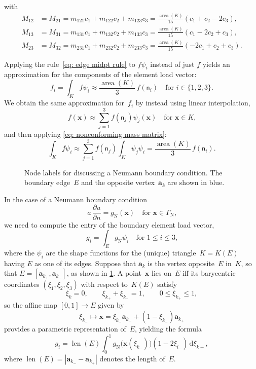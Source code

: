 \documentclass[a4paper,12pt]{article}
\newcommand{\bs}[1]{\boldsymbol{#1}}
\newcommand{\area}{\operatorname{area}}
\newcommand{\len}{\operatorname{len}}
\newcommand{\ud}{\mathrm{d}}
\newcommand{\uN}{\mathrm{N}}
\newcommand{\gN}{g_{\uN}}
\newcommand{\GammaN}{\Gamma_{\uN}}
\begin{document}
with
\begin{align*}
M_{12}&=M_{21}=m_{121}c_1+m_{122}c_2+m_{123}c_3=\frac{\area(K)}{15}
(c_1+c_2-2c_3),\\
M_{13}&=M_{31}=m_{131}c_1+m_{132}c_2+m_{133}c_3=\frac{\area(K)}{15}
(c_1-2c_2+c_3),\\
M_{23}&=M_{32}=m_{231}c_1+m_{232}c_2+m_{233}c_3=\frac{\area(K)}{15}
(-2c_1+c_2+c_3).
\end{align*}

Applying the rule~\eqref{eq: edge midpt rule} to $f\psi_i$ instead of just $f$
yields an approximation for the components of the element load vector:
\[
f_i=\int_Kf\psi_i\approx\frac{\area(K)}{3}\,f(\mathsf{n}_i)
\quad\text{for $i\in\{1,2,3\}$.}
\]
We obtain the same approximation for~$f_i$ by instead using linear
interpolation,
\[
f(\bs{x})\approx\sum_{j=1}^3f(\mathsf{n}_j)\psi_j(\bs{x})
    \quad\text{for $\bs{x}\in K$,}
\]
and then applying \eqref{eq: nonconforming mass matrix}:
\[
\int_Kf\psi_i\approx\sum_{j=1}^3f(\mathsf{n}_j)\int_K\psi_j\psi_i
    =\frac{\area(K)}{3}\,f(\mathsf{n}_i).
\]

\begin{figure}
\caption{Node labels for discussing a Neumann boundary condition. The boundary
edge~$E$ and the opposite vertex~$\bs{a}_k$ are shown in blue.}
\label{fig: Neumann bc}
\begin{center}
\end{center}
\end{figure}

In the case of a Neumann boundary condition
\[
a\,\frac{\partial u}{\partial n}=\gN(\bs{x})\quad\text{for $\bs{x}\in\GammaN$,}
\]
we need to compute the entry of the boundary element load vector,
\[
g_i=\int_E\gN\psi_i\quad\text{for $1\le i\le 3$,}
\]
where the $\psi_i$ are the shape functions for the (unique) triangle~$K=K(E)$
having $E$ as one of its edges.  Suppose that $\bs{a}_k$ is the vertex
opposite~$E$ in~$K$, so that $E=[\bs{a}_{k_+},\bs{a}_{k_-}]$, as shown in
\cref{fig: Neumann bc}.  A point~$\bs{x}$ lies on~$E$ iff its barycentric
coordinates $(\xi_1,\xi_2,\xi_3)$ with respect to~$K(E)$ satisfy
\[
\xi_k=0,\qquad\xi_{k_+}+\xi_{k_-}=1,\qquad0\le\xi_{k_+}\le1,
\]
so the affine map $[0,1]\to E$ given by
\[
\xi_{k_-}\mapsto\bs{x}=\xi_{k_-}\bs{a}_{k_-}+(1-\xi_{k_-})\bs{a}_{k_+}
\]
provides a parametric representation of~$E$, yielding the formula
\[
g_i=\len(E)\int_0^1\gN\bigl(\bs{x}(\xi_{k_-})\bigr)
    (1-2\xi_{i_-})\,\ud\xi_{k-},
\]
where $\len(E)=|\bs{a}_{k_-}-\bs{a}_{k_+}|$ denotes the length of~$E$.
\end{document}
